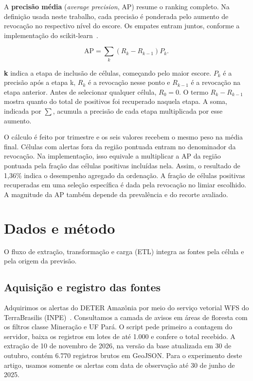 \documentclass[a4paper,conference]{IEEEtran}
\begin{document}
A \textbf{precisão média} (\emph{average precision}, AP) resume o ranking completo. Na definição usada neste trabalho, cada precisão é ponderada pelo aumento de revocação no respectivo nível do escore. Os empates entram juntos, conforme a implementação do scikit-learn~\cite{sklearnap}.

\begin{equation}
\mathrm{AP} = \sum_k (R_k - R_{k-1})P_k.
\end{equation}

\textbf{k} indica a etapa de inclusão de células, começando pelo maior escore. \textbf{$P_k$} é a precisão após a etapa k, \textbf{$R_k$} é a revocação nesse ponto e \textbf{$R_{k-1}$} é a revocação na etapa anterior. Antes de selecionar qualquer célula, \textbf{$R_0=0$}. O termo $R_k-R_{k-1}$ mostra quanto do total de positivos foi recuperado naquela etapa. A soma, indicada por \textbf{$\sum$}, acumula a precisão de cada etapa multiplicada por esse aumento.

O cálculo é feito por trimestre e os seis valores recebem o mesmo peso na média final. Células com alertas fora da região pontuada entram no denominador da revocação. Na implementação, isso equivale a multiplicar a AP da região pontuada pela fração das células positivas incluídas nela. Assim, o resultado de 1,36\% indica o desempenho agregado da ordenação. A fração de células positivas recuperadas em uma seleção específica é dada pela revocação no limiar escolhido. A magnitude da AP também depende da prevalência e do recorte avaliado.

\section{Dados e método}

O fluxo de extração, transformação e carga (ETL) integra as fontes pela célula e pela origem da previsão.

\subsection{Aquisição e registro das fontes}

Adquirimos os alertas do DETER Amazônia por meio do serviço vetorial WFS do TerraBrasilis (INPE)~\cite{inpe}. Consultamos a camada de avisos em áreas de floresta com os filtros classe Mineração e UF Pará. O script pede primeiro a contagem do servidor, baixa os registros em lotes de até 1.000 e confere o total recebido. A extração de 10 de novembro de 2026, na versão da base atualizada em 30 de outubro, contém 6.770 registros brutos em GeoJSON. Para o experimento deste artigo, usamos somente os alertas com data de observação até 30 de junho de 2025.
\end{document}
